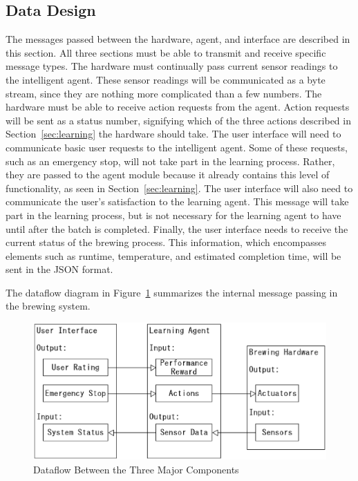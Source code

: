 \documentclass[draftclsnofoot,onecolumn,letterpaper,10pt]{IEEEtran}
\begin{document}
\subsection{Data Design}
The messages passed between the hardware, agent, and interface are described in this section.
All three sections must be able to transmit and receive specific message types.
The hardware must continually pass current sensor readings to the intelligent agent.
These sensor readings will be communicated as a byte stream, since they are nothing more complicated than a few numbers.
The hardware must be able to receive action requests from the agent.
Action requests will be sent as a status number, signifying which of the three actions described in Section~\ref{sec:learning} the hardware should take.
The user interface will need to communicate basic user requests to the intelligent agent.
Some of these requests, such as an emergency stop, will not take part in the learning process.
Rather, they are passed to the agent module because it already contains this level of functionality, as seen in Section~\ref{sec:learning}.
The user interface will also need to communicate the user's satisfaction to the learning agent.
This message will take part in the learning process, but is not necessary for the learning agent to have until after the batch is completed.
Finally, the user interface needs to receive the current status of the brewing process.
This information, which encompasses elements such as runtime, temperature, and estimated completion time, will be sent in the JSON format.

The dataflow diagram in Figure~\ref{fig:dataflow} summarizes the internal message passing in the brewing system.
\begin{figure}[h]\label{fig:dataflow}
\begin{center}
	\caption{Dataflow Between the Three Major Components}
	\includegraphics[width=\linewidth]{dataflow.eps}
\end{center}
\end{figure}
\end{document}
